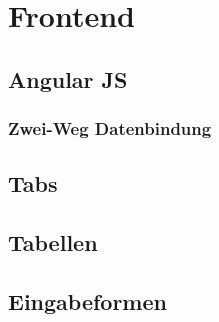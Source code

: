 \section{Frontend}

\subsection{Angular JS}

\subsubsection{Zwei-Weg Datenbindung}

\subsection{Tabs}

\subsection{Tabellen}

\subsection{Eingabeformen}